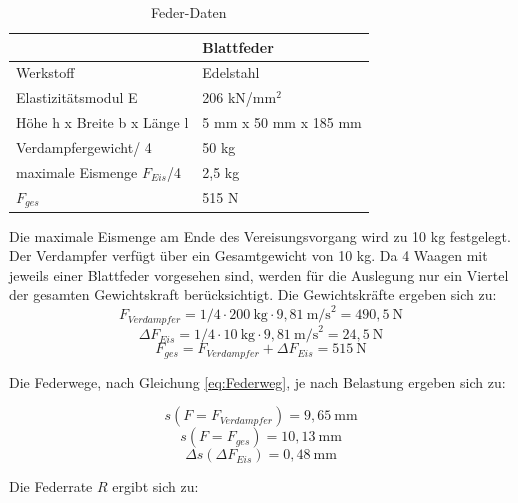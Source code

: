  
\begin{table}[htb]
\centering
\caption{Feder-Daten}\vspace{6pt}
\begin{tabular}{ll}
\hline 
 & \textbf{Blattfeder}  \\ 
\hline 
\hline 
Werkstoff & Edelstahl\\
\hline 
Elastizitätsmodul E & 206 kN/mm$^2$ \\ 
\hline 
Höhe h x Breite b x Länge l & 5 mm x 50 mm x 185 mm\\
\hline
Verdampfergewicht/ 4 & 50 kg\\
\hline
maximale Eismenge $F_{Eis}$/4 & 2,5 kg\\
\hline
$F_{ges}$ & 515 N\\
\hline
\hline
\end{tabular} 
\label{tab:Federblattereigenschaften}
\end{table}

Die maximale Eismenge am Ende des Vereisungsvorgang wird zu 10 kg festgelegt. Der Verdampfer verfügt über ein Gesamtgewicht von 10 kg. Da 4 Waagen mit jeweils einer Blattfeder vorgesehen sind, werden für die Auslegung nur ein Viertel der gesamten Gewichtskraft berücksichtigt.  Die Gewichtskräfte ergeben sich zu:
\begin{equation*}
F_{Verdampfer}= 1/4\cdot 200~\text{kg} \cdot 9,81 ~\text{m/s}^2 = 490,5~ \text{N}
\end{equation*}
\begin{equation*}
\Delta F_{Eis}= 1/4 \cdot 10 ~\text{kg} \cdot 9,81~ \text{m/s}^2 = 24,5~ \text{N}
\end{equation*}
\begin{equation*}
F_{ges}= F_{Verdampfer} + \Delta F_{Eis} = 515 ~\text{N}
\end{equation*}

Die Federwege, nach Gleichung \ref{eq:Federweg}, je nach Belastung ergeben sich zu:

\begin{equation*}
  s(F= F_{Verdampfer})=9,65 ~\text{mm} 
 \end{equation*}
 \begin{equation*}
 s(F= F_{ges})= 10,13 ~\text{mm} 
 \end{equation*}
\begin{equation*}
 \Delta s(\Delta F_{Eis}) = 0,48~ \text{mm}
\end{equation*}

Die Federrate $R$ ergibt sich zu:

